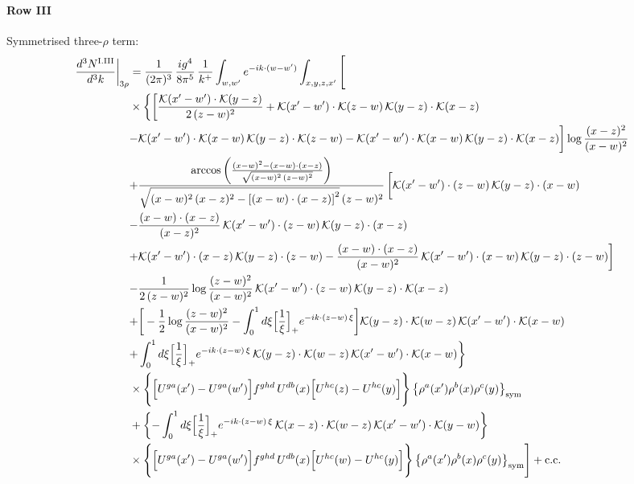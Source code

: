 \documentclass[9pt]{article}
\numberwithin{equation}{section}
\begin{document}
\paragraph*{Row III}
Symmetrised three-$\rho$ term:
\begin{align}
\frac{d^{3}N^{\rm I.III}}{d^{3}k}\bigg|_{3\rho}&=\frac{1}{(2\pi)^{3}}\,\frac{ig^{4}}{8\pi^{5}}\,\frac{1}{k^{+}}\int_{w,w'}e^{-ik\cdot(w-w')}\int_{x,y,z,x'}\Bigg[\notag\\
&\times\bigg\{{\bigg[\frac{\mathcal{K}(x'-w')\cdot\mathcal{K}(y-z)}{2\,(z-w)^{2}}+\mathcal{K}(x'-w')\cdot\mathcal{K}(z-w)\,\mathcal{K}(y-z)\cdot\mathcal{K}(x-z)}\notag\\
&{-\mathcal{K}(x'-w')\cdot\mathcal{K}(x-w)\,\mathcal{K}(y-z)\cdot\mathcal{K}(z-w)-\mathcal{K}(x'-w')\cdot\mathcal{K}(x-w)\,\mathcal{K}(y-z)\cdot\mathcal{K}(x-z)\bigg]\log\frac{(x-z)^{2}}{(x-w)^{2}}}\notag\\
&{+\frac{\arccos\left(\frac{(x-w)^{2}-(x-w)\cdot (x-z)}{\sqrt{(x-w)^{2}\,(z-w)^{2}}}\right)}{\sqrt{(x-w)^{2}\,(x-z)^{2}-\left[(x-w)\cdot (x-z)\right]^{2}}\,(z-w)^{2}}\,\bigg[\mathcal{K}(x'-w')\cdot(z-w)\,\mathcal{K}(y-z)\cdot(x-w)}\notag\\
&{-\frac{(x-w)\cdot(x-z)}{(x-z)^{2}}\,\mathcal{K}(x'-w')\cdot(z-w)\,\mathcal{K}(y-z)\cdot(x-z)}\notag\\
&{+\mathcal{K}(x'-w')\cdot(x-z)\,\mathcal{K}(y-z)\cdot(z-w)-\frac{(x-w)\cdot(x-z)}{(x-w)^{2}}\,\mathcal{K}(x'-w')\cdot(x-w)\,\mathcal{K}(y-z)\cdot(z-w)\bigg]}\notag\\
&{-\frac{1}{2\,(z-w)^{2}}\log\frac{(z-w)^{2}}{(x-w)^{2}}\,\mathcal{K}(x'-w')\cdot(z-w)\,\mathcal{K}(y-z)\cdot\mathcal{K}(x-z)}\notag\\
&{+\bigg[-\frac{1}{2}\log\frac{(z-w)^{2}}{(x-w)^{2}}-\int_{0}^{1}d\xi\Big[\frac{1}{\xi}\Big]_{+}e^{-ik\cdot(z-w)\,\xi}\bigg]\mathcal{K}(y-z)\cdot\mathcal{K}(w-z)\,\mathcal{K}(x'-w')\cdot\mathcal{K}(x-w)}\notag\\
&{+\int_{0}^{1}d\xi\Big[\frac{1}{\xi}\Big]_{+}e^{-ik\cdot(z-w)\,\xi}\,\mathcal{K}(y-z)\cdot\mathcal{K}(w-z)\,\mathcal{K}(x'-w')\cdot\mathcal{K}(x-w)}\bigg\}\notag\\
&\times \Bigg\{\Big[U^{ga}(x')-U^{ga}(w')\Big]f^{ghd}\,U^{db}(x)\Big[U^{hc}(z)-U^{hc}(y)\Big]\Bigg\}\,\big\{\rho^{a}(x')\rho^{b}(x)\rho^{c}(y)\big\}_{\rm sym}\notag\\
&+\bigg\{{-\int_{0}^{1}d\xi\Big[\frac{1}{\xi}\Big]_{+}e^{-ik\cdot(z-w)\,\xi}\,\mathcal{K}(x-z)\cdot\mathcal{K}(w-z)\,\mathcal{K}(x'-w')\cdot\mathcal{K}(y-w)}\bigg\}\notag\\
&\times \Bigg\{\Big[U^{ga}(x')-U^{ga}(w')\Big]f^{ghd}\,U^{db}(x)\Big[U^{hc}(w)-U^{hc}(y)\Big]\Bigg\}\,\big\{\rho^{a}(x')\rho^{b}(x)\rho^{c}(y)\big\}_{\rm sym}\Bigg]+{\rm c.c.}\label{eq:H-I.III-3}
\end{align}
\end{document}
